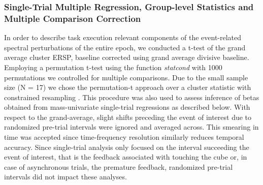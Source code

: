 \subsubsection{Single-Trial Multiple Regression, Group-level Statistics and Multiple Comparison Correction}
In order to describe task execution relevant components of the event-related spectral perturbations of the entire epoch, we conducted a t-test of the grand average cluster ERSP, baseline corrected using grand average divisive baseline. Employing a permutation t-test using the function \textit{statcond} with 1000 permutations we controlled for multiple comparisons. Due to the small sample size (N = 17) we chose the permutation-t approach over a cluster statistic with constrained resampling \cite{Pernet2015}. This procedure was also used to assess inference of betas obtained from mass-univariate single-trial regressions as described below. With respect to the grand-average, slight shifts preceding the event of interest due to randomized pre-trial intervals were ignored and averaged across. This smearing in time was accepted since time-frequency resolution similarly reduces temporal accuracy. Since single-trial analysis only focused on the interval succeeding the event of interest, that is the feedback associated with touching the cube or, in case of asynchronous trials, the premature feedback, randomized pre-trial intervals did not impact these analyses.

